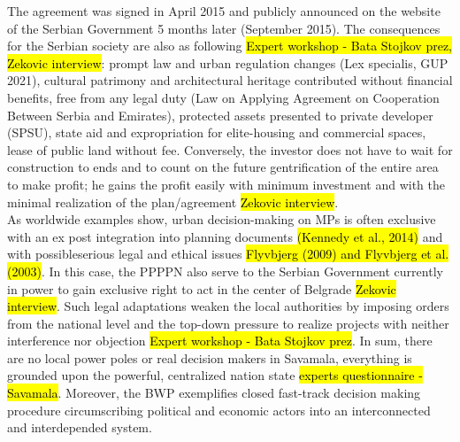 \documentclass[11pt]{report}
\begin{document}
The agreement was signed in April 2015 and publicly announced on the website of the Serbian Government 5 months later (September 2015).
The consequences for the Serbian society are also as following \hl{Expert workshop - Bata Stojkov prez, Zekovic interview}:
prompt law and urban regulation changes (Lex specialis, GUP 2021), 
cultural patrimony and architectural heritage contributed without financial benefits, 
free from any legal duty (Law on Applying Agreement on Cooperation Between Serbia and Emirates),
protected assets presented to private developer (SPSU),
state aid and expropriation for elite-housing and commercial spaces,
lease of public land without fee.
Conversely, the investor does not have to wait for construction to ends and to count on the future gentrification of the entire area to make profit; he gains the profit easily with minimum investment and with the minimal realization of the plan/agreement \hl{Zekovic interview}.
\\
As worldwide examples show, urban decision-making on MPs is often exclusive with an ex post integration into planning documents \hl{(Kennedy et al., 2014)} and with possibleserious legal and ethical issues \hl{Flyvbjerg (2009) and Flyvbjerg et al. (2003)}. 
In this case, the PPPPN also serve to the Serbian Government currently in power to gain exclusive right to act in the center of Belgrade \hl{Zekovic interview}. Such legal adaptations weaken the local authorities by imposing orders from the national level and the top-down pressure to realize projects with neither interference nor objection \hl{Expert workshop - Bata Stojkov prez}.
In sum, there are no local power poles or real decision makers in Savamala, everything is grounded upon the powerful, centralized nation state \hl{experts questionnaire - Savamala}. Moreover, the BWP exemplifies closed fast-track decision making procedure circumscribing political and economic actors into an interconnected and interdepended system.
\end{document}

